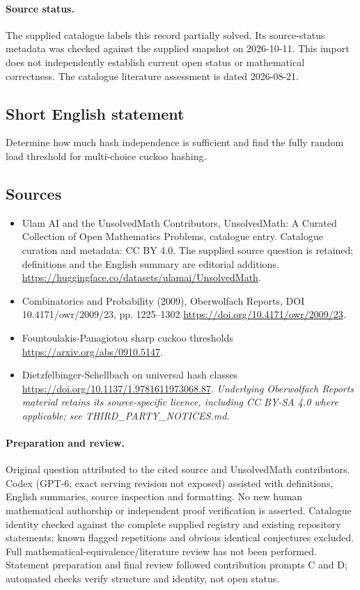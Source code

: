 \documentclass[11pt]{article}
\begin{document}
\paragraph{Source status.}
The supplied catalogue labels this record partially solved. Its source-status metadata was checked against the supplied snapshot on 2026-10-11. This import does not independently establish current open status or mathematical correctness. The catalogue literature assessment is dated 2026-08-21.
\subsection{Short English statement}
Determine how much hash independence is sufficient and find the fully random load threshold for multi-choice cuckoo hashing.
\subsection{Sources}
\begin{itemize}
\item[S1] Ulam AI and the UnsolvedMath Contributors, UnsolvedMath: A Curated Collection of Open Mathematics Problems, catalogue entry. Catalogue curation and metadata: CC BY 4.0. The supplied source question is retained; definitions and the English summary are editorial additions.
\url{https://huggingface.co/datasets/ulamai/UnsolvedMath}.
\item[S2] Combinatorics and Probability (2009), Oberwolfach Reports, DOI 10.4171/owr/2009/23, pp. 1225--1302
\url{https://doi.org/10.4171/owr/2009/23}.
\item[S3] Fountoulakis-Panagiotou sharp cuckoo thresholds
\url{https://arxiv.org/abs/0910.5147}.
\item[S4] Dietzfelbinger-Schellbach on universal hash classes
\url{https://doi.org/10.1137/1.9781611973068.87}.
\textit{Underlying Oberwolfach Reports material retains its source-specific licence, including CC BY-SA 4.0 where applicable; see THIRD\_PARTY\_NOTICES.md.}
\end{itemize}
\paragraph{Preparation and review.}
Original question attributed to the cited source and UnsolvedMath contributors. Codex (GPT-6; exact serving revision not exposed) assisted with definitions, English summaries, source inspection and formatting. No new human mathematical authorship or independent proof verification is asserted. Catalogue identity checked against the complete supplied registry and existing repository statements; known flagged repetitions and obvious identical conjectures excluded. Full mathematical-equivalence/literature review has not been performed. Statement preparation and final review followed contribution prompts C and D; automated checks verify structure and identity, not open status.
\label{end:statement}
\end{document}
